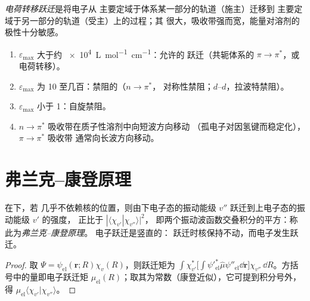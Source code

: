 \begin{definition}[电荷转移跃迁]\label{def:b3:electronic-spectroscopy:charge-transfer}
\emph{电荷转移跃迁}是将电子从
主要定域于体系某一部分的轨道（施主）迁移到
主要定域于另一部分的轨道（受主）上的过程；其
很大，吸收带强而宽，能量对溶剂的
极性十分敏感。
\end{definition}

\begin{method}[吸收带的指认]\label{met:b3:electronic-spectroscopy:assign-band}
\begin{enumerate}
  \item $\varepsilon_{\max}$ 大于约 \qty{e4}{L.mol^{-1}.cm^{-1}}：允许的
        跃迁（共轭体系的 $\pi\to\pi^*$，或电荷转移）。
  \item $\varepsilon_{\max}$ 为 10 至几百：禁阻的（$n\to\pi^*$，
        对称性禁阻；$d$--$d$，拉波特禁阻）。
  \item $\varepsilon_{\max}$ 小于 1：自旋禁阻。
  \item $n\to\pi^*$ 吸收带在质子性溶剂中向短波方向移动
        （孤电子对因氢键而稳定化），$\pi\to\pi^*$ 吸收带
        通常向长波方向移动。
\end{enumerate}
\end{method}

\section{弗兰克–康登原理}

\begin{theorem}\label{thm:b3:electronic-spectroscopy:franck-condon}
在下，若
几乎不依赖核的位置，则由下电子态的振动能级 $v''$
跃迁到上电子态的振动能级 $v'$ 的强度，
正比于 $|\langle\chi_{v'}|\chi_{v''}\rangle|^2$，
即两个振动波函数交叠积分的平方：称此为\emph{弗兰克–康登原理}。
电子跃迁是竖直的：
跃迁时核保持不动，而电子发生跃迁。
\end{theorem}

\begin{proof}
取 $\Psi = \psi_{\mathrm{el}}(\mathbf r;R)\chi_v(R)$，则跃迁矩为
$\int\chi_{v'}^*\big[\int\psi'^*_{\mathrm{el}}\hat\mu\psi''_{\mathrm{el}}\dd\mathbf r\big]
\chi_{v''}\,\dd R$。方括号中的量即电子跃迁矩
$\mu_{\mathrm{el}}(R)$；取其为常数（康登近似），它可提到积分号外，
得 $\mu_{\mathrm{el}}\langle\chi_{v'}|\chi_{v''}\rangle$。
\end{proof}

